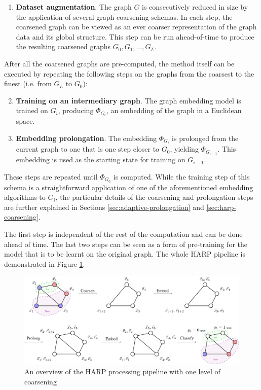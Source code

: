 \begin{enumerate}
  \item \textbf{Dataset augmentation}. The graph \( G \) is consecutively reduced in size by the application of several graph coarsening schemas. In each step, the coarsened graph can be viewed as an ever coarser representation of the graph data and its global structure. This step can be run ahead-of-time to produce the resulting coarsened graphs \( G_0, G_1, \dots, G_L \).
\end{enumerate}
After all the coarsened graphs are pre-computed, the method itself can be executed by repeating the following steps on the graphs from the coarsest to the finest (i.e. from \( G_L \) to \( G_0 \)):
\begin{enumerate}\setcounter{enumi}{1}
  \item \textbf{Training on an intermediary graph}. The graph embedding model is trained on \( G_i \), producing \( \Phi_{G_i} \), an embedding of the graph in a Euclidean space.
  \item \textbf{Embedding prolongation}. The embedding \( \Phi_{G_i} \) is prolonged from the current graph to one that is one step closer to \( G_0 \), yielding \( \Phi_{G_{i - 1}} \). This embedding is used as the starting state for training on \( G_{i - 1} \).
\end{enumerate}
These steps are repeated until \( \Phi_{G_0} \) is computed. While the training step of this schema is a straightforward application of one of the aforementioned embedding algorithms to \( G_i \), the particular details of the coarsening and prolongation steps are further explained in Sections \ref{sec:adaptive-prolongation} and \ref{sec:harp-coarsening}.

The first step is independent of the rest of the computation and can be done ahead of time. The last two steps can be seen as a form of pre-training for the model that is to be learnt on the original graph. The whole HARP pipeline is demonstrated in Figure \ref{fig:harp-overview}.

\begin{figure}
  \centering
  \includegraphics[width=\textwidth]{images/harp-overview/harp-overview.pdf}
  \caption{An overview of the HARP processing pipeline with one level of coarsening}
  \label{fig:harp-overview}
\end{figure}

